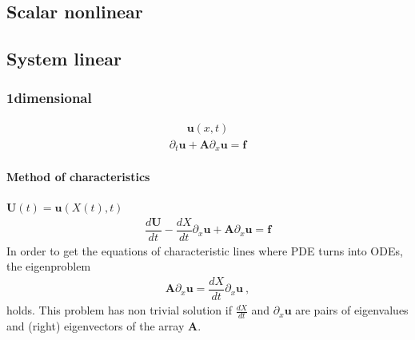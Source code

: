 \documentclass[letterpaper,10pt,english]{jupyterBook}
\begin{document}
\subsection{Scalar non\sphinxhyphen{}linear}
\label{\detokenize{ch/pde/hyperbolic-dimensions:scalar-non-linear}}\label{\detokenize{ch/pde/hyperbolic-dimensions:pde-hyperbolic-scalar-non-linear}}

\subsection{System linear}
\label{\detokenize{ch/pde/hyperbolic-dimensions:system-linear}}\label{\detokenize{ch/pde/hyperbolic-dimensions:pde-hyperbolic-system-linear}}

\subsubsection{1\sphinxhyphen{}dimensional}
\label{\detokenize{ch/pde/hyperbolic-dimensions:id1}}\begin{equation*}
\begin{split}\mathbf{u}(x,t)\end{split}
\end{equation*}\begin{equation*}
\begin{split}\partial_t \mathbf{u} + \mathbf{A} \partial_x \mathbf{u} = \mathbf{f}\end{split}
\end{equation*}

\paragraph{Method of characteristics}
\label{\detokenize{ch/pde/hyperbolic-dimensions:method-of-characteristics}}
\sphinxAtStartPar
{} \(\mathbf{U}(t) = \mathbf{u}(X(t), t)\)
\begin{equation*}
\begin{split}\dfrac{d \mathbf{U}}{dt} - \dfrac{d X}{dt} \partial_x \mathbf{u} + \mathbf{A} \partial_x \mathbf{u} = \mathbf{f}\end{split}
\end{equation*}
\sphinxAtStartPar
In order to get the equations of characteristic lines where PDE turns into ODEs, the eigenproblem
\begin{equation*}
\begin{split}\mathbf{A} \partial_x \mathbf{u} = \dfrac{d X}{d t} \partial_x \mathbf{u} \ ,\end{split}
\end{equation*}
\sphinxAtStartPar
holds. This problem has non trivial solution if \(\frac{d X}{dt}\) and \(\partial_x \mathbf{u}\) are pairs of eigenvalues and (right) eigenvectors of the array \(\mathbf{A}\).
\end{document}

